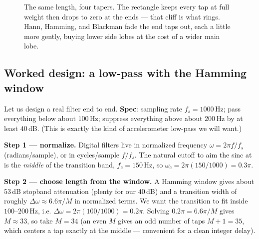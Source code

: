 \begin{figure}[H]
\centering
{}
\caption{The same length, four tapers. The rectangle keeps every tap at full
weight then drops to zero at the ends --- that cliff is what rings. Hann, Hamming,
and Blackman fade the end taps out, each a little more gently, buying lower side
lobes at the cost of a wider main lobe.}
\label{ch16:fig-windows}
\end{figure}

\subsection{Worked design: a low-pass with the Hamming window}
\label{ch16:worked-fir}

Let us design a real filter end to end. \textbf{Spec}: sampling rate
$f_s = 1000$\,Hz; pass everything below about $100$\,Hz; suppress everything above
about $200$\,Hz by at least $40$\,dB. (This is exactly the kind of accelerometer
low-pass we will want.)

\textbf{Step 1 --- normalize.} Digital filters live in normalized frequency
$\omega = 2\pi f / f_s$ (radians/sample), or in cycles/sample $f/f_s$. The natural
cutoff to aim the sinc at is the \emph{middle} of the transition band,
$f_c = 150$\,Hz, so $\omega_c = 2\pi (150/1000) = 0.3\pi$.

\textbf{Step 2 --- choose length from the window.} A Hamming window gives about
$53$\,dB stopband attenuation (plenty for our $40$\,dB) and a transition width of
roughly $\Delta\omega \approx 6.6\pi/M$ in normalized terms. We want the
transition to fit inside $100$--$200$\,Hz, i.e.
$\Delta\omega = 2\pi(100/1000) = 0.2\pi$. Solving $0.2\pi = 6.6\pi/M$ gives
$M \approx 33$, so take $M=34$ (an even $M$ gives an odd number of taps $M+1=35$,
which centers a tap exactly at the middle --- convenient for a clean integer
delay).

